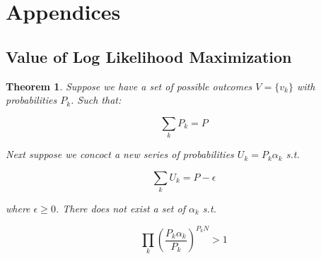 \documentclass[11pt]{article}
\newtheorem{theorem}{Theorem}
\begin{document}
\section{Appendices}


\subsection{Value of Log Likelihood Maximization}

\begin{theorem}
Suppose we have a set of possible outcomes $V=\lbrace v_k \rbrace$ with probabilities $P_k$. Such that:

$$\sum_k P_k = P$$

Next suppose we concoct a new series of probabilities $U_k = P_k \alpha_k$ s.t. 

$$\sum_k U_k = P-\epsilon$$

where $\epsilon \geq 0$. There does not exist a set of $\alpha_k$ s.t.

$$\prod_k \left(\frac{P_k\alpha_k}{P_k}\right)^{P_kN}>1$$

\end{theorem}
\end{document}
